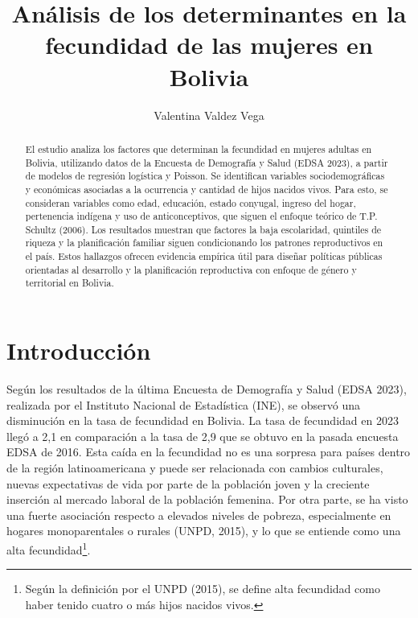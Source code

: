 \documentclass[Royal,times,sageh]{sagej}
\begin{document}

\title{Análisis de los determinantes en la fecundidad de las mujeres en
Bolivia}

\runninghead{}

\author{Valentina Valdez Vega}




\begin{abstract}
El estudio analiza los factores que determinan la fecundidad en mujeres
adultas en Bolivia, utilizando datos de la Encuesta de Demografía y
Salud (EDSA 2023), a partir de modelos de regresión logística y Poisson.
Se identifican variables sociodemográficas y económicas asociadas a la
ocurrencia y cantidad de hijos nacidos vivos. Para esto, se consideran
variables como edad, educación, estado conyugal, ingreso del hogar,
pertenencia indígena y uso de anticonceptivos, que siguen el enfoque
teórico de T.P. Schultz (2006). Los resultados muestran que factores la
baja escolaridad, quintiles de riqueza y la planificación familiar
siguen condicionando los patrones reproductivos en el país. Estos
hallazgos ofrecen evidencia empírica útil para diseñar políticas
públicas orientadas al desarrollo y la planificación reproductiva con
enfoque de género y territorial en Bolivia.
\end{abstract}


\maketitle

\section{Introducción}\label{introducciuxf3n}

Según los resultados de la última Encuesta de Demografía y Salud (EDSA
2023), realizada por el Instituto Nacional de Estadística (INE), se
observó una disminución en la tasa de fecundidad en Bolivia. La tasa de
fecundidad en 2023 llegó a 2,1 en comparación a la tasa de 2,9 que se
obtuvo en la pasada encuesta EDSA de 2016. Esta caída en la fecundidad
no es una sorpresa para países dentro de la región latinoamericana y
puede ser relacionada con cambios culturales, nuevas expectativas de
vida por parte de la población joven y la creciente inserción al mercado
laboral de la población femenina. Por otra parte, se ha visto una fuerte
asociación respecto a elevados niveles de pobreza, especialmente en
hogares monoparentales o rurales (UNPD, 2015), y lo que se entiende como
una alta fecundidad\footnote{Según la definición por el UNPD (2015), se
  define alta fecundidad como haber tenido cuatro o más hijos nacidos
  vivos.}.
\end{document}
